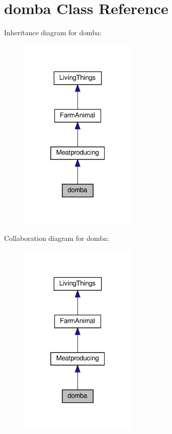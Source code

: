\hypertarget{classdomba}{}\section{domba Class Reference}
\label{classdomba}


Inheritance diagram for domba\+:
\nopagebreak
\begin{figure}[H]
\begin{center}
\leavevmode
\includegraphics[width=160pt]{classdomba__inherit__graph}
\end{center}
\end{figure}


Collaboration diagram for domba\+:
\nopagebreak
\begin{figure}[H]
\begin{center}
\leavevmode
\includegraphics[width=160pt]{classdomba__coll__graph}
\end{center}
\end{figure}
